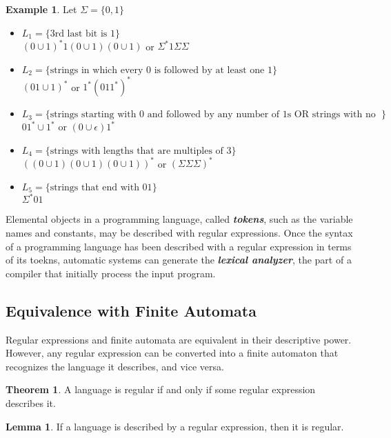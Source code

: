 \documentclass{article}
\theoremstyle{definition}
\newtheorem{example}{Example}[section]
\newtheorem{theorem}{Theorem}[section]
\newtheorem{lemma}{Lemma}
\newcommand{\define}[1]{\textbf{\textit{#1}}}
\begin{document}
\begin{example}
  \item Let $\Sigma = \{0,1\}$
  \begin{itemize}
    \item $L_1 = \{\textrm{3rd last bit is 1}\}$ \\ 
      $(0 \cup 1)^{*} 1 (0 \cup 1) (0 \cup 1)$ or $\Sigma^{*}1\Sigma\Sigma$
  \item $L_2 = \{\textrm{strings in which every 0 is followed by at least one 1}\}$ \\
    $(0 1 \cup 1)^{*}$ or $1^{*}(011^{*})^{*}$
  \item $L_3 = \{\textrm{strings starting with 0 and followed by any number of 1s OR strings with no 0}\}$ \\ 
    $01^{*} \cup 1^{*}$ or $(0 \cup \epsilon)1^{*}$
  \item $L_4 = \{\textrm{strings with lengths that are multiples of 3}\}$ \\ 
    $((0 \cup 1) (0 \cup 1) (0 \cup 1))^{*}$ or $(\Sigma \Sigma \Sigma)^{*}$
  \item $L_5 = \{\textrm{strings that end with 01}\}$ \\ 
    $\Sigma^{*} 01$
  \end{itemize}
\end{example}

Elemental objects in a programming language, called \define{tokens}, such as the variable names and constants, may be described with regular expressions. Once the syntax of a programming language has been described with a regular expression in terms of its toekns, automatic systems can generate the \define{lexical analyzer}, the part of a compiler that initially process the input program.  

\subsection{Equivalence with Finite Automata}

Regular expressions and finite automata are equivalent in their descriptive power. However, any regular expression can be converted into a finite automaton that recognizes the language it describes, and vice versa. 

\begin{theorem}
  A language is regular if and only if some regular expression describes it.
\end{theorem}

\begin{lemma}
  If a language is described by a regular expression, then it is regular. 
\end{lemma}
\end{document}
